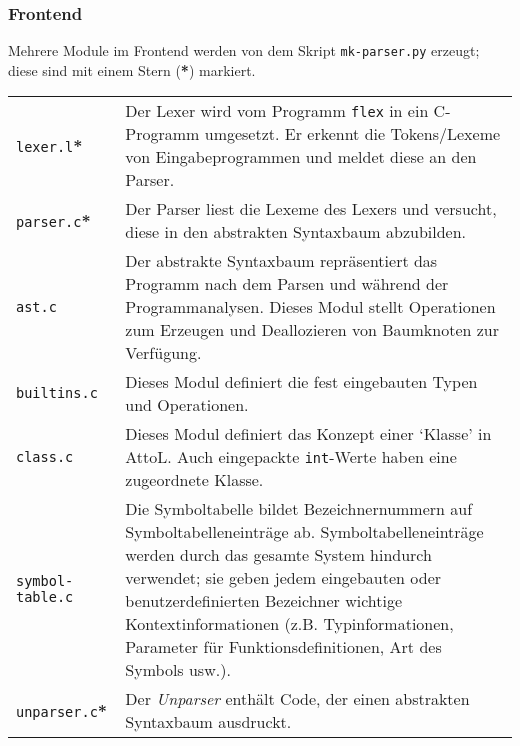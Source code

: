 \documentclass[11pt,a4paper]{article}
\begin{document}
\subsubsection{Frontend}

Mehrere Module im Frontend werden von dem Skript \texttt{mk-parser.py} erzeugt; diese sind mit einem  Stern (\textbf{*}) markiert.

\begin{tabular}{p{4cm}p{12cm}}
\texttt{lexer.l}\textbf{*} & Der Lexer wird vom Programm \texttt{flex} in ein C-Programm umgesetzt.  Er erkennt die Tokens/Lexeme von
Eingabeprogrammen und meldet diese an den Parser. \\
\texttt{parser.c}\textbf{*} & Der Parser liest die Lexeme des Lexers und versucht, diese in den abstrakten Syntaxbaum abzubilden. \\
\texttt{ast.c} & Der abstrakte Syntaxbaum repräsentiert das Programm nach dem Parsen und während der Programmanalysen.  Dieses Modul stellt Operationen zum Erzeugen
und Deallozieren von Baumknoten zur Verfügung.
\\
\texttt{builtins.c} & Dieses Modul definiert die fest eingebauten Typen und Operationen. \\
\texttt{class.c} & Dieses Modul definiert das Konzept einer `Klasse' in AttoL.  Auch eingepackte \texttt{int}-Werte haben eine zugeordnete Klasse. \\
\texttt{symbol-table.c} & Die Symboltabelle bildet Bezeichnernummern auf Symboltabelleneinträge ab.  Symboltabelleneinträge werden durch
das gesamte System hindurch verwendet; sie geben jedem eingebauten oder benutzerdefinierten Bezeichner wichtige Kontextinformationen (z.B. Typinformationen, Parameter für Funktionsdefinitionen, Art des Symbols usw.). \\
\texttt{unparser.c}\textbf{*} & Der \emph{Unparser} enthält Code, der einen abstrakten Syntaxbaum ausdruckt.\\
\end{tabular}

\end{document}
